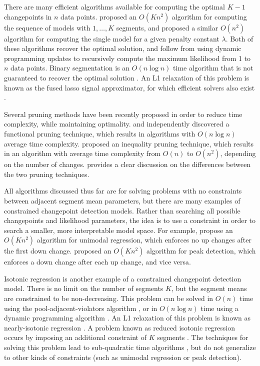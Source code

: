 \documentclass{article}
\begin{document}
There are many efficient algorithms available for computing the
optimal $K-1$ changepoints in $n$ data
points. \citet{segment-neighborhood} proposed an $O(K n^2)$ algorithm
for computing the sequence of models with $1,\dots,K$ segments, and
\citet{optimal-partitioning} proposed a similar $O(n^2)$ algorithm for
computing the single model for a given penalty constant
$\lambda$. Both of these algorithms recover the optimal solution, and
follow from using dynamic programming updates \citep{bellman} to
recursively compute the maximum likelihood from 1 to $n$ data
points. Binary segmentation is an $O(n\log n)$ time algorithm that is
not guaranteed to recover the optimal solution
\citep{binary-segmentation}. An L1 relaxation of this problem is
known as the fused lasso signal approximator, for which efficient
solvers also exist \citep{flsa}.

Several pruning methods have been recently proposed in order to reduce
time complexity, while maintaining optimality.  \citet{pruned-dp} and
\citet{phd-johnson} independently discovered a functional pruning
technique, which results in algorithms with $O(n\log n)$ average time
complexity. \citet{pelt} proposed an inequality pruning technique,
which results in an algorithm with average time complexity from $O(n)$
to $O(n^2)$, depending on the number of changes. \citet{fpop} provides
a clear discussion on the differences between the two pruning
techniques.

All algorithms discussed thus far are for solving problems with no
constraints between adjacent segment mean parameters, but there are
many examples of constrained changepoint detection models. Rather
than searching all possible changepoints and likelihood parameters,
the idea is to use a constraint in order to search a smaller, more
interpretable model space. For example, \citet{haiminen2008algorithms}
propose an $O(Kn^2)$ algorithm for unimodal regression, which enforces
no up changes after the first down change. \citet{HOCKING-PeakSeg}
proposed an $O(Kn^2)$ algorithm for peak detection, which enforces a
down change after each up change, and vice versa.

Isotonic regression is another example of a constrained changepoint
detection model. There is no limit on the number of segments $K$, but
the segment means are constrained to be non-decreasing. This problem
can be solved in $O(n)$ time using the pool-adjacent-violators
algorithm \citep{mair2009isotone}, or in $O(n\log n)$ time using a
dynamic programming algorithm \citep{isotonic-dp}. An L1 relaxation of
this problem is known as nearly-isotonic regression
\citep{tibshirani2011nearly}. A problem known as reduced isotonic
regression occurs by imposing an additional constraint of $K$ segments
\citep{reduced-monotonic-regression}. The techniques for solving this
problem lead to sub-quadratic time algorithms
\citep{hardwick2014optimal}, but do not generalize to other kinds of
constraints (such as unimodal regression or peak detection).
\end{document}
